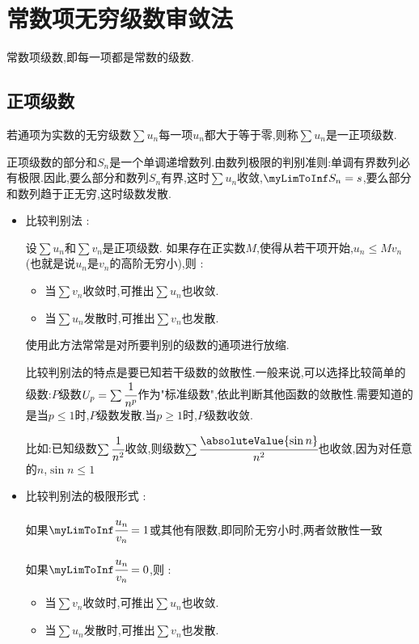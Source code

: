 {{\section{常数项无穷级数审敛法}{
  常数项级数,即每一项都是常数的级数.

  \subsection{正项级数}{
    若通项为实数的无穷级数$\sum u_n$每一项$u_n$都大于等于零,则称$\sum u_n$是一正项级数.

    正项级数的部分和$S_n$是一个单调递增数列.由数列极限的判别准则:单调有界数列必有极限.因此,要么部分和数列$S_n$有界,这时$\sum u_n$收敛,$\myLimToInf S_n = s$,要么部分和数列趋于正无穷,这时级数发散.

    \begin{itemize}
      \item {
            比较判别法 :

            设$\sum u_n$和$\sum v_n$是正项级数.
            如果存在正实数$M$,使得从若干项开始,$u_n \leq Mv_n$(也就是说$u_n$是$v_n$的高阶无穷小),则 :
            \begin{itemize}
              \item 当$\sum v_n$收敛时,可推出$\sum u_n$也收敛.
              \item 当$\sum u_n$发散时,可推出$\sum v_n$也发散.
            \end{itemize}

            使用此方法常常是对所要判别的级数的通项进行放缩.

            比较判别法的特点是要已知若干级数的敛散性.一般来说,可以选择比较简单的级数:$P$级数$U_p = \sum\cfrac{1}{n^p}$作为"标准级数",依此判断其他函数的敛散性.需要知道的是当$p \leq 1$时,$P$级数发散.当$p \geq 1$时,$P$级数收敛.

            比如:已知级数$\sum \cfrac{1}{n^2}$收敛,则级数$\sum \cfrac{\absoluteValue{\sin n}}{n^2}$也收敛,因为对任意的$n$,$\sin n \leq 1$
            }
      \item{
            比较判别法的极限形式 :

            如果$\myLimToInf\cfrac{u_n}{v_n} = 1$或其他有限数,即同阶无穷小时,两者敛散性一致

            如果$\myLimToInf\cfrac{u_n}{v_n} = 0$,则 :
            \begin{itemize}
              \item 当$\sum v_n$收敛时,可推出$\sum u_n$也收敛.
              \item 当$\sum u_n$发散时,可推出$\sum v_n$也发散.
            \end{itemize}

}
\end{itemize}}}}}
